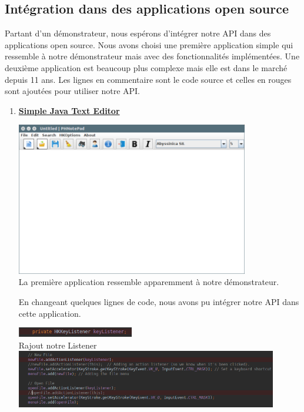 \documentclass[12pt,a4paper]{article}
\begin{document}
\subsection{Intégration dans des applications open source}
Partant d'un démonstrateur, nous espérons d'intégrer notre API dans des applications open source. Nous avons choisi une première application simple qui ressemble à notre démonstrateur mais avec des fonctionnalités implémentées. Une deuxième application est beaucoup plus complexe mais elle est dans le marché depuis 11 ans. Les lignes en commentaire sont le code source et celles en rouges sont ajoutées pour utiliser notre API.
\begin{enumerate}
\item {\large \textbf{\href{https://github.com/pH-7/Simple-Java-Text-Editor}{Simple Java Text Editor}}}\\
\begin{center}
	\includegraphics[width=0.8\textwidth]{01.png}\\
	La première application ressemble apparemment à notre démonstrateur.
\end{center}
En changeant quelques lignes de code, nous avons pu intégrer notre API dans cette application.
\begin{center}
	\includegraphics[width=0.4\textwidth]{02.png}\\
	Rajout notre Listener\\
	\includegraphics[width=0.9\textwidth]{04.png}\\

\end{center}
\end{enumerate}
\end{document}
